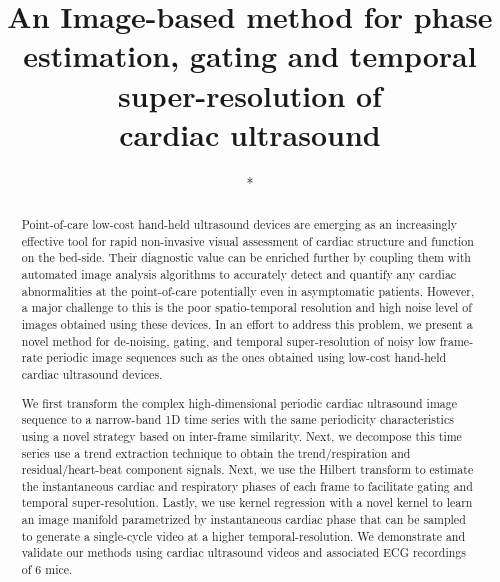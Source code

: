 \documentclass[runningheads,a4paper]{llncs}
\begin{document}
\mainmatter  %

\title{An Image-based method for phase estimation, gating and temporal super-resolution of \\cardiac ultrasound}


%
%

\author{*}
\authorrunning{*}   
\tocauthor{*}
\institute{*}

\maketitle

\begin{abstract}
Point-of-care low-cost hand-held ultrasound devices are emerging as an increasingly effective tool for rapid non-invasive visual assessment of cardiac structure and function on the bed-side. Their diagnostic value can be enriched further by coupling them with automated image analysis algorithms to accurately detect and quantify any cardiac abnormalities at the point-of-care potentially even in asymptomatic patients. However, a major challenge to this is the poor spatio-temporal resolution and high noise level of images obtained using these devices. In an effort to address this problem, we present a novel method for de-noising, gating, and temporal super-resolution of noisy low frame-rate periodic image sequences such as the ones obtained using low-cost hand-held cardiac ultrasound devices. 

We first transform the complex high-dimensional periodic cardiac ultrasound image sequence to a narrow-band 1D time series with the same periodicity characteristics using a novel strategy based on inter-frame similarity. Next, we decompose this time series use a trend extraction technique to obtain the trend/respiration and residual/heart-beat component signals. Next, we use the Hilbert transform to estimate the instantaneous cardiac and respiratory phases of each frame to facilitate gating and temporal super-resolution. Lastly, we use kernel regression with a novel kernel to learn an image manifold parametrized by instantaneous cardiac phase that can be sampled to generate a single-cycle video at a higher temporal-resolution. We demonstrate and validate our methods using cardiac ultrasound videos and associated ECG recordings of 6 mice.
\end{abstract}
\end{document}
